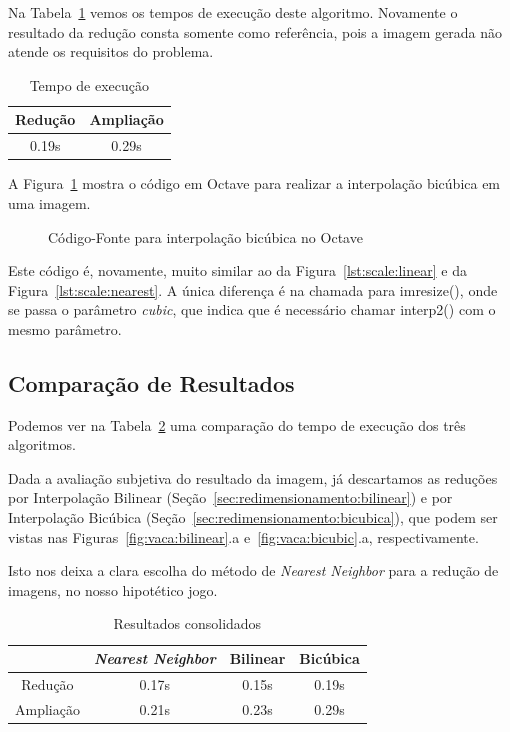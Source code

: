 \documentclass[12pt]{article}
\begin{document}
Na Tabela~\ref{tab:bicubic} vemos os tempos de execução deste algoritmo. Novamente o resultado da redução consta somente como referência, pois a imagem gerada não atende os requisitos do problema.

\begin{table}[H]
    \caption{Tempo de execução}
    \centering
    \label{tab:bicubic}
    \begin{tabular}{c||c}
     Redução & Ampliação \\
     \hline
     0.19s & 0.29s
    \end{tabular}
\end{table}

A Figura~\ref{lst:scale:cubic} mostra o código em Octave para realizar a interpolação bicúbica em uma imagem.

\begin{figure}[H]

\caption{Código-Fonte para interpolação bicúbica no Octave}
\label{lst:scale:cubic}
\end{figure}

Este código é, novamente, muito similar ao da Figura~\ref{lst:scale:linear} e da Figura~\ref{lst:scale:nearest}. A única diferen\c{c}a é na chamada para \textsf{imresize()}, onde se passa o parâmetro \emph{cubic}, que indica que é necessário chamar \textsf{interp2()} com o mesmo parâmetro.

\subsection{Comparação de Resultados}\label{sec:redimensionamento:comparacao}

Podemos ver na Tabela~\ref{tab:scale:resultados} uma comparação do tempo de execução dos três algoritmos.

Dada a avaliação subjetiva do resultado da imagem, já descartamos as redu\c{c}ões por Interpolação Bilinear (Seção~\ref{sec:redimensionamento:bilinear}) e por Interpolação Bicúbica (Seção~\ref{sec:redimensionamento:bicubica}), que podem ser vistas nas Figuras~\ref{fig:vaca:bilinear}.a e~\ref{fig:vaca:bicubic}.a, respectivamente.

Isto nos deixa a clara escolha do método de \textit{Nearest Neighbor} para a redução de imagens, no nosso hipotético jogo.

\begin{table}[H]
  \centering
  \begin{tabular}[H]{c || c | c | c}
   & \textit{Nearest Neighbor} & Bilinear & Bicúbica \\
    \hline
   Redução & 0.17s & 0.15s & 0.19s \\
   Ampliação & 0.21s & 0.23s & 0.29s
  \end{tabular}
  \caption{Resultados consolidados}
  \label{tab:scale:resultados}
\end{table}
\end{document}
